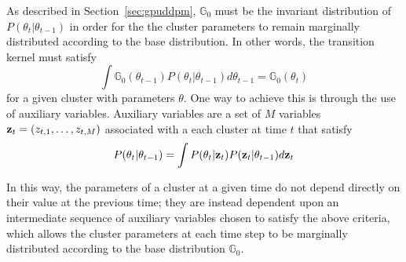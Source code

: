 \documentclass[twocolumn, final]{svjour3}
\begin{document}
As described in Section~\ref{sec:gpuddpm}, $\mathbb{G}_{0}$ must be the invariant distribution of $P(\theta_{t} | \theta_{t-1})$ in order for the the cluster parameters to remain marginally distributed according to the base distribution. In other words, the transition kernel must satisfy
\begin{equation}
\int \mathbb{G}_{0}(\theta_{t-1})P(\theta_{t} | \theta_{t-1}) d\theta_{t-1} = \mathbb{G}_{0}(\theta_{t})
\end{equation}
for a given cluster with parameters $\theta$. One way to achieve this is through the use of auxiliary variables. Auxiliary variables are a set of $M$ variables $\bold{z}_{t} = (z_{t,1}, \ldots, z_{t,M})$ associated with a each cluster at time $t$ that satisfy
\begin{eqnarray}
P(\theta_{t} | \theta_{t-1}) = \int P(\theta_{t} | \bold{z}_{t}) P(\bold{z}_{t} | \theta_{t-1}) d \bold{z}_{t}  %
\end{eqnarray}

In this way, the parameters of a cluster at a given time do not depend directly on their value at the previous time; they are instead dependent upon an intermediate sequence of auxiliary variables chosen to satisfy the above criteria, which allows the cluster parameters at each time step to be marginally distributed according to the base distribution $\mathbb{G}_{0}$.
\end{document}
